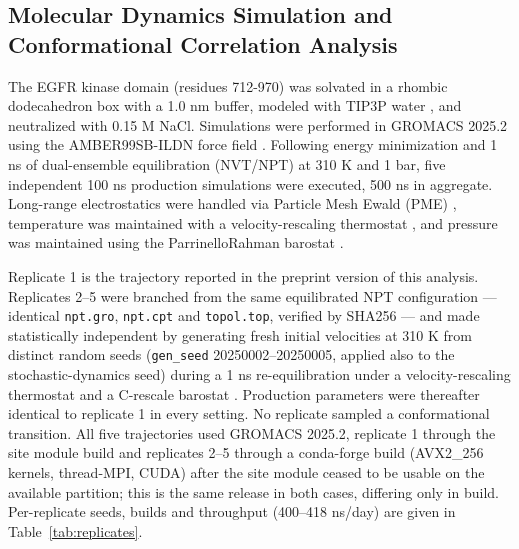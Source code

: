 \documentclass[utf8]{FrontiersinHarvard}
\begin{document}
\subsection{Molecular Dynamics Simulation and Conformational Correlation Analysis}
\label{sec:mdmethods}

The EGFR kinase domain (residues 712-970) was solvated in a rhombic dodecahedron box with a 1.0 nm buffer, modeled with TIP3P water \citep{Jorgensen1983}, and neutralized with 0.15 M NaCl. Simulations were performed in GROMACS 2025.2 \citep{Abraham2015} using the AMBER99SB-ILDN force field \citep{LindorffLarsen2010}. Following energy minimization and 1 ns of dual-ensemble equilibration (NVT/NPT) at 310 K and 1 bar, five independent 100 ns production simulations were executed, 500 ns in aggregate. Long-range electrostatics were handled via Particle Mesh Ewald (PME) \citep{Darden1993}, temperature was maintained with a velocity-rescaling thermostat \citep{Bussi2007}, and pressure was maintained using the Parrinello\textendash Rahman barostat \citep{ParrinelloRahman1981}.

Replicate 1 is the trajectory reported in the preprint version of this analysis. Replicates 2--5 were branched from the same equilibrated NPT configuration --- identical \texttt{npt.gro}, \texttt{npt.cpt} and \texttt{topol.top}, verified by SHA256 --- and made statistically independent by generating fresh initial velocities at 310 K from distinct random seeds (\texttt{gen\_seed} 20250002--20250005, applied also to the stochastic-dynamics seed) during a 1 ns re-equilibration under a velocity-rescaling thermostat and a C-rescale barostat \citep{Bernetti2020}. Production parameters were thereafter identical to replicate 1 in every setting. No replicate sampled a conformational transition. All five trajectories used GROMACS 2025.2, replicate 1 through the site module build and replicates 2--5 through a conda-forge build (AVX2\_256 kernels, thread-MPI, CUDA) after the site module ceased to be usable on the available partition; this is the same release in both cases, differing only in build. Per-replicate seeds, builds and throughput (400--418 ns/day) are given in Table~\ref{tab:replicates}.
\end{document}
